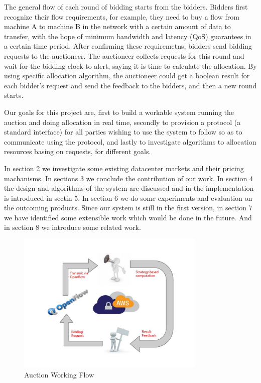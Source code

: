 \documentclass[a4paper,11pt,twocolumn]{article}
\begin{document}
The general flow of each round of bidding starts from the bidders. Bidders first recognize their flow requirements, for example, they need to buy a flow 
from machine A to machine B in the network with a certain amount of data to transfer, with the hope of minimum bandwidth and latency (QoS) guarantees in 
a certain time period. After confirming these requiremetns, bidders send bidding requests to the auctioneer. The auctioneer collects requests for this 
round and wait for the bidding clock to alert, saying it is time to calculate the allocation. By using specific allocation algorithm, the auctioneer could
get a boolean result for each bidder's request and send the feedback to the bidders, and then a new round starts.

Our goals for this project are, first to build a workable system running the auction and doing allocation in real time, secondly to provision a 
protocol (a standard interface) for all parties wishing to use the system to follow so as to communicate using the protocol, and lastly to investigate
algorithms to allocation resources basing on requests, for different goals. 

In section 2 we investigate some existing datacenter markets and their pricing machanisms. In sections 3 we conclude the contribution of our work. 
In section 4 the design and algorithms of the system are discussed and in the implementation is introduced in sectin 5. In section 6 we do some 
experiments and evaluation on the outcoming products. Since our system is still in the first version, in section 7 we have identified some extensible
work which would be done in the future. And in section 8 we introduce some related work.

\begin{figure}[ht!]
\centering
\includegraphics[width=90mm]{general_flow.jpg}
\caption{Auction Working Flow}
\label{overflow}
\end{figure}
\end{document}
